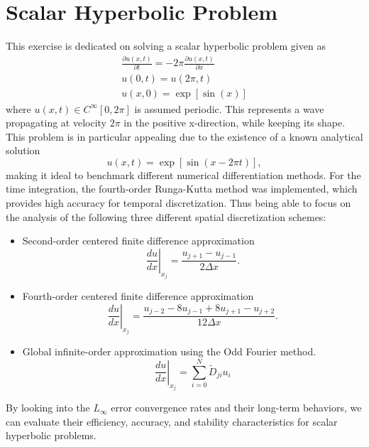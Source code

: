 \section{Scalar Hyperbolic Problem}
This exercise is dedicated on solving a scalar hyperbolic problem given as
\begin{equation}
	\begin{gathered}
		\frac{\partial u(x, t)}{\partial t}=-2 \pi \frac{\partial u(x, t)}{\partial x} \\
		u(0, t)=u(2 \pi, t) \\
		u(x, 0)=\exp [\sin (x)]
	\end{gathered}
\end{equation}
where $u(x,t) \in C^\infty[0, 2\pi]$ is assumed periodic. This represents a wave propagating at velocity $2\pi$ in the positive x-direction, while keeping its shape.
This problem is in particular appealing due to the existence of a known analytical solution
\begin{equation}
	u(x, t)=\exp [\sin (x-2 \pi t)],
\end{equation}
making it ideal to benchmark different numerical differentiation methods.
For the time integration, the fourth-order Runga-Kutta method was implemented, which provides high accuracy for temporal discretization.
Thus being able to focus on the analysis of the following three different spatial discretization schemes:
\begin{itemize}
	\item Second-order centered finite difference approximation
	      \begin{equation}
		      \left.\frac{d u}{d x}\right|_{x_j}=\frac{u_{j+1}-u_{j-1}}{2 \Delta x} .
	      \end{equation}
	\item Fourth-order centered finite difference approximation
	      \begin{equation}
		      \left.\frac{d u}{d x}\right|_{x_j}=\frac{u_{j-2}-8 u_{j-1}+8 u_{j+1}-u_{j+2}}{12 \Delta x} .
	      \end{equation}
	\item Global infinite-order approximation using the Odd Fourier method.
	      \begin{equation}
		      \left.\frac{d u}{d x}\right|_{x_j}=\sum_{i=0}^N \tilde{D}_{j i} u_i
	      \end{equation}
\end{itemize}
By looking into the $L_\infty$ error convergence rates and their long-term behaviors, we can evaluate their efficiency, accuracy, and stability characteristics for scalar hyperbolic problems.

